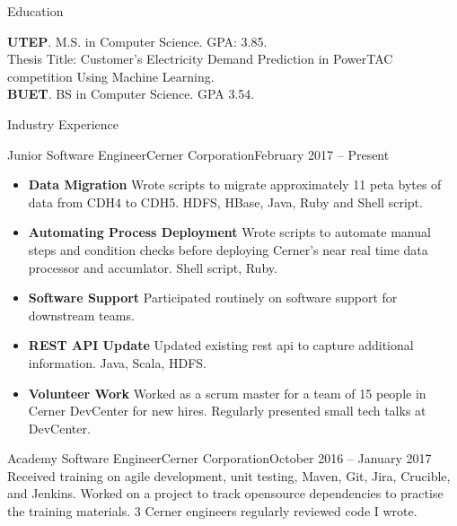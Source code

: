 \documentclass[]{mcdowellcv}
\begin{document}
	\makeheader
	
	
	\begin{cvsection}{Education}
		\begin{cvsubsection}{}{}{}
				\textbf{UTEP}. M.S. in Computer Science.  GPA: 3.85. \\
				Thesis Title: Customer's Electricity Demand Prediction in PowerTAC competition Using Machine Learning. \\
				\textbf{BUET}. BS in Computer Science. GPA 3.54.  
		\end{cvsubsection}
	\end{cvsection}

	\begin{cvsection}{Industry Experience}
		\begin{cvsubsection}{Junior Software Engineer}{Cerner Corporation}{February 2017 -- Present}
			\begin{itemize}
				\item \textbf{Data Migration} Wrote scripts to migrate approximately 11 peta bytes of data from CDH4 to CDH5. HDFS, HBase, Java, Ruby and Shell script.		
				\item \textbf{Automating Process Deployment} Wrote scripts to automate manual steps and condition checks before deploying Cerner's near real time data processor and accumlator. Shell script, Ruby.
				\item \textbf{Software Support} Participated routinely on software support for downstream teams. 
				\item \textbf{REST API Update} Updated existing rest api to capture additional information. Java, Scala, HDFS. 
				\item \textbf{Volunteer Work} Worked as a scrum master for a team of 15 people in Cerner DevCenter for new hires. Regularly presented small tech talks at DevCenter. 
			\end{itemize}
		\end{cvsubsection}		
		\begin{cvsubsection}{Academy Software Engineer}{Cerner Corporation}{October 2016 -- January 2017}	
			Received training on agile development, unit testing, Maven, Git, Jira, Crucible, and Jenkins. Worked on a project to track opensource dependencies to practise the training materials. 3 Cerner engineers regularly reviewed code I wrote.
		\end{cvsubsection}
	\end{cvsection}
	
\end{document}
